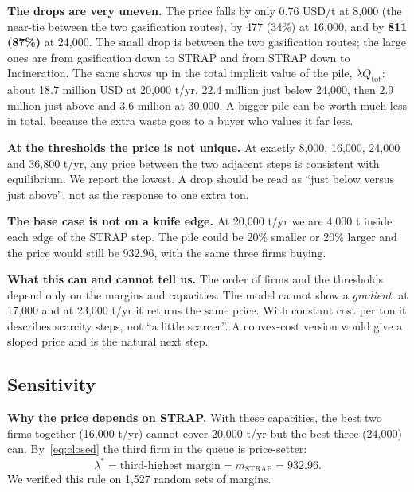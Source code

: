 \documentclass[11pt]{article}
\newcommand{\usd}{USD}
\newcommand{\strap}{\mathrm{STRAP}}
\begin{document}
\textbf{The drops are very uneven.} The price falls by only 0.76 \usd/t at 8{,}000
(the near-tie between the two gasification routes), by 477 (34\%) at 16{,}000, and by
\textbf{811 (87\%)} at 24{,}000. The small drop is between the two gasification
routes; the large ones are from gasification down to STRAP and from STRAP down to
Incineration. The same shows up in the total implicit value of the pile,
$\lambda Q_{\mathrm{tot}}$: about 18.7 million \usd{} at 20{,}000 t/yr, 22.4 million
just below 24{,}000, then 2.9 million just above and 3.6 million at 30{,}000. A bigger
pile can be worth much less in total, because the extra waste goes to a buyer who
values it far less.

\textbf{At the thresholds the price is not unique.} At exactly 8{,}000, 16{,}000,
24{,}000 and 36{,}800 t/yr, any price between the two adjacent steps is consistent
with equilibrium. We report the lowest. A drop should be read as ``just below versus
just above'', not as the response to one extra ton.

\begin{readbox}
\textbf{The base case is not on a knife edge.} At 20{,}000 t/yr we are 4{,}000 t
inside each edge of the STRAP step. The pile could be 20\% smaller or 20\% larger
and the price would still be 932.96, with the same three firms buying.

\textbf{What this can and cannot tell us.} The order of firms and the thresholds
depend only on the margins and capacities. The model cannot show a \emph{gradient}:
at 17{,}000 and at 23{,}000 t/yr it returns the same price. With constant cost per
ton it describes scarcity steps, not ``a little scarcer''. A convex-cost version
would give a sloped price and is the natural next step.
\end{readbox}

\subsection{Sensitivity}
\label{sec:sensitivity}

\textbf{Why the price depends on STRAP.} With these capacities, the best two firms
together (16{,}000 t/yr) cannot cover 20{,}000 t/yr but the best three (24{,}000)
can. By~\eqref{eq:closed} the third firm in the queue is price-setter:
\[
\lambda^\ast=\text{third-highest margin}=m_\strap=932.96 .
\]
We verified this rule on 1{,}527 random sets of margins.
\end{document}
